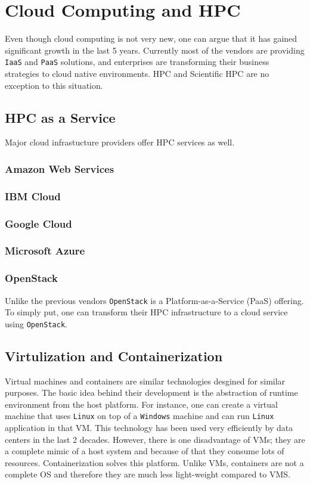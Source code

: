 \chapter{Cloud Computing and HPC} \label{chap-cloud}
Even though cloud computing is not very new, one can argue that it has gained significant growth
in the last 5 years. Currently most of the vendors are providing \texttt{IaaS} and \texttt{PaaS}
solutions, and enterprises are transforming their business strategies to cloud native environments. 
\newline \newline
HPC and Scientific HPC are no exception to this situation.

\section{HPC as a Service}
Major cloud infrastucture providers offer HPC services as well.
\subsection{Amazon Web Services}
\subsection{IBM Cloud}
\subsection{Google Cloud}
\subsection{Microsoft Azure}
\subsection{OpenStack}
Unlike the previous vendors \texttt{OpenStack} is a Platform-as-a-Service (PaaS) offering. To simply
put, one can transform their HPC infrastructure to a cloud service using \texttt{OpenStack}.

\section{Virtulization and Containerization}
Virtual machines and containers are similar technologies desgined for similar purposes. The basic
idea behind their development is the abstraction of runtime environment from the host platform. 
For instance, one can create a virtual machine that uses \texttt{Linux} on top of a \texttt{Windows} 
machine and can run \texttt{Linux} application in that VM. This technology has been used very 
efficiently by data centers in the last 2 decades. However, there is one disadvantage of VMs; they
are a complete mimic of a host system and because of that they consume lots of resources.   
\newline \newline
Containerization solves this platform. Unlike VMs, containers are not a complete OS and therefore
they are much less light-weight compared to VMS.
